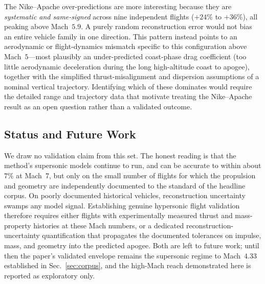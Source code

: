 The Nike--Apache over-predictions are more interesting because they are
\emph{systematic and same-signed} across nine independent flights ($+24\%$ to
$+36\%$), all peaking above Mach~$5.9$. A purely random reconstruction error would
not bias an entire vehicle family in one direction. This pattern instead points to
an aerodynamic or flight-dynamics mismatch specific to this configuration above
Mach~$5$---most plausibly an under-predicted coast-phase drag coefficient (too
little aerodynamic deceleration during the long high-altitude coast to apogee),
together with the simplified thrust-misalignment and dispersion assumptions of a
nominal vertical trajectory. Identifying which of these dominates would require the
detailed range and trajectory data that motivate treating the Nike--Apache result
as an open question rather than a validated outcome.

\subsection{Status and Future Work}

We draw no validation claim from this set. The honest reading is that the
method's supersonic models continue to run, and can be accurate to within about
$7\%$ at Mach~7, but only on the small number of flights for which the propulsion
and geometry are independently documented to the standard of the headline corpus.
On poorly documented historical vehicles, reconstruction uncertainty swamps any
model signal. Establishing genuine hypersonic flight validation therefore
requires either flights with experimentally measured thrust and mass-property
histories at these Mach numbers, or a dedicated reconstruction-uncertainty
quantification that propagates the documented tolerances on impulse, mass, and
geometry into the predicted apogee. Both are left to future work; until then the
paper's validated envelope remains the supersonic regime to Mach~$4.33$
established in Sec.~\ref{sec:corpus}, and the high-Mach reach demonstrated here is reported as
exploratory only.
